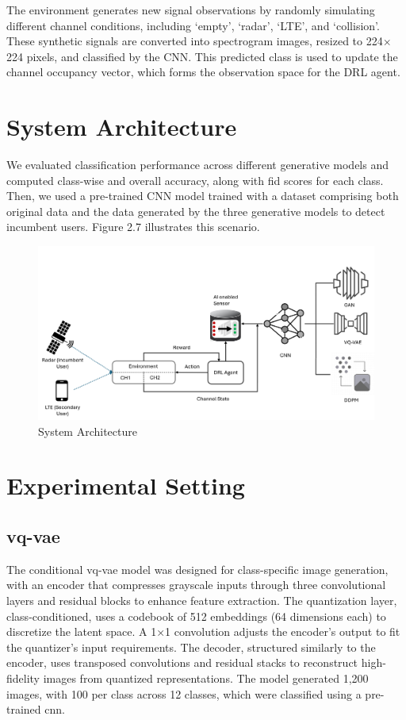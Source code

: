 The environment generates new signal observations by randomly simulating different channel conditions, including ‘empty’, ‘radar’, ‘LTE’, and ‘collision’. These synthetic signals are converted into spectrogram images, resized to 224$\times$224 pixels, and classified by the CNN. This predicted class is used to update the channel occupancy vector, which forms the observation space for the DRL agent.

\section{System Architecture}

We evaluated classification performance across different generative models and computed class-wise and overall accuracy, along with \gls{fid} scores for each class. Then, we used a pre-trained CNN model trained with a dataset comprising both original data and the data generated by the three generative models to detect incumbent users. Figure 2.7 illustrates this scenario.
\begin{figure}[h]
\includegraphics[width=\textwidth]{figures/system-architecture.png}
\centering
\caption{ System Architecture}
\centering
\end{figure}

\section{Experimental Setting}
\subsection{\gls{vq-vae}}
The conditional \gls{vq-vae} model was designed for class-specific image generation, with an encoder that compresses grayscale inputs through three convolutional layers and residual blocks to enhance feature extraction. The quantization layer, class-conditioned, uses a codebook of 512 embeddings (64 dimensions each) to discretize the latent space. A 1×1 convolution adjusts the encoder's output to fit the quantizer's input requirements. The decoder, structured similarly to the encoder, uses transposed convolutions and residual stacks to reconstruct high-fidelity images from quantized representations. The model generated 1,200 images, with 100 per class across 12 classes, which were classified using a pre-trained \gls{cnn}.

